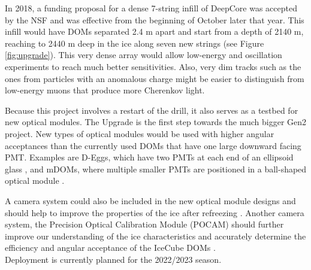In 2018, a funding proposal for a dense 7-string infill of DeepCore was accepted by the NSF and was effective from the beginning of October later that year. This infill would have DOMs separated 2.4 m apart and start from a depth of 2140 m, reaching to 2440 m deep in the ice along seven new strings (see Figure \ref{fig:upgrade}). This very dense array would allow low-energy and oscillation experiments to reach much better sensitivities. Also, very dim tracks such as the ones from particles with an anomalous charge might be easier to distinguish from low-energy muons that produce more Cherenkov light. 

Because this project involves a restart of the drill, it also serves as a testbed for new optical modules. The Upgrade is the first step towards the much bigger Gen2 project. New types of optical modules would be used with higher angular acceptances than the currently used DOMs that have one large downward facing PMT. Examples are D-Eggs, which have two PMTs at each end of an ellipsoid glass \cite{Ishihara:2017vxn}, and mDOMs, where multiple smaller PMTs are positioned in a ball-shaped optical module \cite{Classen:2017sng}. 

A camera system could also be included in the new optical module designs and should help to improve the properties of the ice after refreezing \cite{Collaboration:2017chl}. Another camera system, the Precision Optical Calibration Module (POCAM) should further improve our understanding of the ice characteristics and accurately determine the efficiency and angular acceptance of the IceCube DOMs \cite{Resconi:2017mad}.\\
\newline
Deployment is currently planned for the 2022/2023 season.

